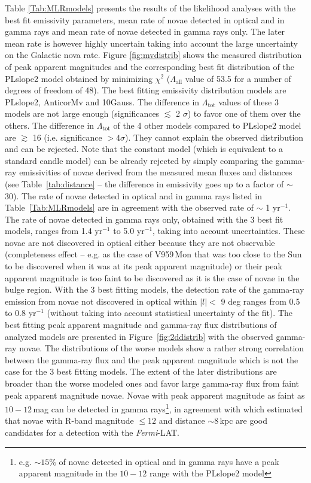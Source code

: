 \documentclass{aa} %
\newcommand{\Fermi}{\textit{Fermi}}
\newcommand{\tot}{\textrm{tot} }
\begin{document}
Table \ref{Tab:MLRmodels} presents the results of the likelihood analyses with the best fit emissivity parameters, mean rate of novae detected in optical and in gamma rays and mean rate of novae detected in gamma rays only. The later mean rate is however highly uncertain taking into account the large uncertainty on the Galactic nova rate. Figure \ref{fig:mvdistrib} shows the measured distribution of peak apparent magnitudes and the corresponding best fit distribution of the PLslope2 model obtained by minimizing $\chi^2$ ($\Lambda_{\textrm{all}}$ value of 53.5 for a number of degrees of freedom of 48). 
The best fitting emissivity distribution models are PLslope2, AnticorMv and 10Gauss. The difference in $\Lambda_{\tot}$ values of these 3 models are not large enough (significances $\lesssim$ 2 $\sigma$) to favor one of them over the others. The difference in $\Lambda_{\tot}$ of the 4 other models compared to PLslope2 model are $\gtrsim$ 16 (i.e. significance $> 4 \sigma$). They cannot explain the observed distribution and can be rejected. Note that the constant model (which is equivalent to a standard candle model) can be already rejected by simply comparing the gamma-ray emissivities of novae derived from the measured mean fluxes and distances (see Table~\ref{tab:distance} -- the difference in emissivity goes up to a factor of $\sim$ 30). The rate of novae detected in optical and in gamma rays listed in Table~\ref{Tab:MLRmodels} are in agreement with the observed rate of $\sim$ 1 yr$^{-1}$. The rate of novae detected in gamma rays only, obtained with the 3 best fit models, ranges from 1.4 yr$^{-1}$ to 5.0 yr$^{-1}$, taking into account uncertainties. These novae are not discovered in optical either because they are not observable (completeness effect -- e.g. as the case of V959\,Mon that was too close to the Sun to be discovered when it was at its peak apparent magnitude) or their peak  apparent magnitude is too faint to be discovered as it is the case of novae in the bulge region. With the 3 best fitting models, the detection rate of the gamma-ray emission from novae not discovered in optical within $\vert l \vert < $ 9 deg ranges from 0.5 to 0.8 yr$^{-1}$ (without taking into account statistical uncertainty of the fit). 
The best fitting peak apparent magnitude and gamma-ray flux distributions of analyzed models are presented in Figure~\ref{fig:2ddistrib} with the observed gamma-ray novae. The distributions of the worse models show a rather strong correlation between the gamma-ray flux and the peak apparent magnitude which is not the case for the 3 best fitting models. The extent of the later distributions are broader than the worse modeled ones and favor large gamma-ray flux from faint peak apparent magnitude novae. Novae with peak apparent magnitude as faint as $10-12$\,mag can be detected in gamma rays\footnote{e.g. $\sim 15$\% of novae detected in optical and in gamma rays have a peak apparent magnitude in the $10-12$ range with the PLslope2 model}, in agreement with \citet{2017MNRAS.465.1218M} which estimated that novae with R-band magnitude $\leq12$ and distance $\sim8$\,kpc are good candidates for a detection with the \Fermi-LAT.
\end{document}
